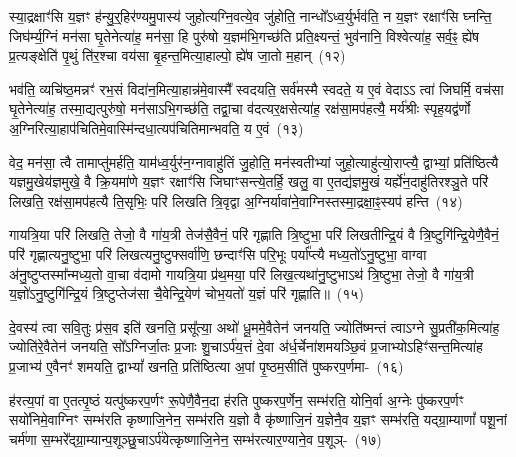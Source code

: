 स्या॒द्रक्षाꣳ॑सि य॒ज्ञꣳ ह॑न्यु॒र्॒\mbox{}हिर॑ण्यमु॒पास्य॑ जुहोत्यग्नि॒वत्ये॒व जु॑होति॒ नान्धो᳚\-ऽध्व॒र्युर्भव॑ति॒ न य॒ज्ञꣳ रक्षाꣳ॑सि घ्नन्ति॒ जिघ॑र्म्य॒ग्निं मन॑सा घृ॒तेनेत्या॑ह॒ मन॑सा॒ हि पुरु॑षो य॒ज्ञम॑भि॒गच्छ॑ति प्रति॒क्ष्यन्तं॒ भुव॑नानि॒ विश्वेत्या॑ह॒ सर्व॒ꣴ॒ ह्ये॑ष प्र॒त्यङ्क्षेति॑ पृ॒थुं ति॑र॒श्चा वय॑सा बृ॒हन्त॒मित्या॒हाल्पो॒ ह्ये॑ष जा॒तो म॒हान्~(१२)\ip

भव॑ति॒ व्यचि॑ष्ठ॒मन्नꣳ॑ रभ॒सं विदा॑न॒मित्या॒हान्न॑मे॒वास्मै᳚ स्वदयति॒ सर्व॑मस्मै स्वदते॒ य ए॒वं वेदा\-ऽऽ त्वा॑ जिघर्मि॒ वच॑सा घृ॒तेनेत्या॑ह॒ तस्मा॒द्यत्पुरु॑षो॒ मन॑सा\-ऽ\-भि॒गच्छ॑ति॒ तद्वा॒चा व॑दत्यर॒क्षसेत्या॑ह॒ रक्ष॑सा॒मप॑हत्यै॒ मर्य॑श्रीः स्पृह॒यद्व॑र्णो अ॒ग्निरित्या॒हाप॑\-चितिमे॒वास्मि॑न्दधा॒त्यप॑\-चितिमान्भवति॒ य ए॒वं~(१३)\ip

वेद॒ मन॑सा॒ त्वै तामाप्तु॑मर्\mbox{}हति॒ याम॑ध्व॒र्युर॑न॒ग्नावाहु॑तिं जु॒होति॒ मन॑स्वतीभ्यां जुहो॒त्याहु॑त्यो॒राप्त्यै॒ द्वाभ्यां॒ प्रति॑ष्ठित्यै यज्ञमु॒खेय॑ज्ञमुखे॒ वै क्रि॒यमा॑णे य॒ज्ञꣳ रक्षाꣳ॑सि जिघाꣳसन्त्ये॒तर्\mbox{}हि॒ खलु॒ वा ए॒तद्य॑ज्ञमु॒खं यर्\mbox{}ह्ये॑न॒दाहु॑तिरश्ञु॒ते परि॑ लिखति॒ रक्ष॑सा॒मप॑हत्यै ति॒सृभिः॒ परि॑ लिखति त्रि॒वृद्वा अ॒ग्निर्यावा॑ने॒वाग्निस्तस्मा॒द्रक्षा॒ꣴ॒स्यप॑ हन्ति~(१४)\ip

गायत्रि॒या परि॑ लिखति॒ तेजो॒ वै गा॑य॒त्री तेज॑सै॒वैनं॒ परि॑ गृह्णाति त्रि॒ष्टुभा॒ परि॑ लिखतीन्द्रि॒यं वै त्रि॒ष्टुगि॑न्द्रि॒येणै॒वैनं॒ परि॑ गृह्णात्यनु॒ष्टुभा॒ परि॑ लिखत्यनु॒ष्टुफ्सर्वा॑णि॒ छन्दाꣳ॑सि परि॒भूः पर्या᳚प्त्यै मध्य॒तो॑\-ऽनु॒ष्टुभा॒ वाग्वा अ॑नु॒ष्टुप्तस्मा᳚न्मध्य॒तो वा॒चा व॑दामो गायत्रि॒या प्र॑थ॒मया॒ परि॑ लिख॒त्यथा॑नु॒ष्टुभाऽथ॑ त्रि॒ष्टुभा॒ तेजो॒ वै गा॑य॒त्री य॒ज्ञो॑\-ऽनु॒ष्टुगि॑न्द्रि॒यं त्रि॒ष्टुप्तेज॑सा चै॒वेन्द्रि॒येण॑ चोभ॒यतो॑ य॒ज्ञं परि॑ गृह्णाति॥~(१५)\ip

{\anuvakamend[{अ॒न्धो᳚\-ऽध्व॒र्युर्म॒हान्भ॑वति त्रि॒ष्टुभा॒ तेजो॒ वै गा॑य॒त्री त्रयो॑दश च}]}

दे॒वस्य॑ त्वा सवि॒तुः प्र॑स॒व इति॑ खनति॒ प्रसू᳚त्या॒ अथो॑ धू॒ममे॒वैतेन॑ जनयति॒ ज्योति॑ष्मन्तं त्वाऽग्ने सु॒प्रती॑क॒मित्या॑ह॒ ज्योति॑रे॒वैतेन॑ जनयति॒ सो᳚\-ऽग्निर्जा॒तः प्र॒जाः शु॒चा\-ऽ\-र्प॑य॒त्तं दे॒वा अ॑र्ध॒र्चेना॑शमयञ्छि॒वं प्र॒जाभ्यो\-ऽहिꣳ॑सन्त॒मित्या॑ह प्र॒जाभ्य॑ ए॒वैनꣳ॑ शमयति॒ द्वा\-भ्यां᳚ खनति॒ प्रति॑ष्ठित्या अ॒पां पृ॒ष्ठम॒सीति॑ पुष्करप॒र्णमा-~(१६)\ip

ह॑रत्य॒पां वा ए॒तत्पृ॒ष्ठं यत्पु॑ष्करप॒र्णꣳ रू॒पेणै॒वैन॒दा ह॑रति पुष्करप॒र्णेन॒ सम्भ॑रति॒ योनि॒र्वा अ॒ग्नेः पु॑ष्करप॒र्णꣳ सयो॑निमे॒वाग्निꣳ सम्भ॑रति कृष्णाजि॒नेन॒ सम्भ॑रति य॒ज्ञो वै कृ॑ष्णाजि॒नं य॒ज्ञेनै॒व य॒ज्ञꣳ सम्भ॑रति॒ यद्ग्रा॒म्याणां᳚ पशू॒नां चर्म॑णा स॒म्भरे᳚द्ग्रा॒म्यान्प॒शूञ्छु॒चा\-ऽर्प॑येत्कृष्णाजि॒नेन॒ सम्भ॑रत्यार॒ण्याने॒व प॒शूञ्-~(१७)\ip

